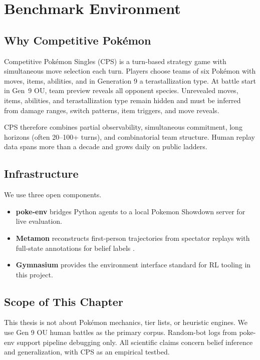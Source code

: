 \chapter{Benchmark Environment}
\label{ch:benchmark}

\section{Why Competitive Pok\'emon}

Competitive Pok\'emon Singles (CPS) is a turn-based strategy game with
simultaneous move selection each turn. Players choose teams of six Pok\'emon
with moves, items, abilities, and in Generation 9 a terastallization type. At
battle start in Gen~9 OU, team preview reveals all opponent species.
Unrevealed moves, items, abilities, and terastallization type remain hidden and
must be inferred from damage ranges, switch patterns, item triggers, and move
reveals.

CPS therefore combines partial observability, simultaneous commitment, long
horizons (often 20--100+ turns), and combinatorial team structure. Human replay
data spans more than a decade and grows daily on public ladders.

\section{Infrastructure}

We use three open components.
\begin{itemize}
  \item \textbf{poke-env} bridges Python agents to a local Pokemon Showdown
    server for live evaluation.
  \item \textbf{Metamon} reconstructs first-person trajectories from spectator
    replays with full-state annotations for belief labels \citep{grigsby2023metamon}.
  \item \textbf{Gymnasium} provides the environment interface standard for RL
    tooling in this project.
\end{itemize}

\section{Scope of This Chapter}

This thesis is not about Pok\'emon mechanics, tier lists, or heuristic engines.
We use Gen 9 OU human battles as the primary corpus. Random-bot logs from
poke-env support pipeline debugging only. All scientific claims concern belief
inference and generalization, with CPS as an empirical testbed.

